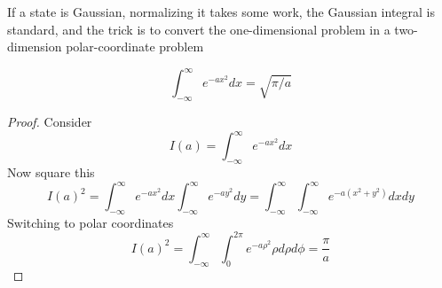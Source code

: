 \documentclass{tufte-book}
\newcommand{\infint}{\int^{\infty}_{-\infty}}
\begin{document}
If a state is Gaussian, normalizing it takes some work, the Gaussian integral is standard, and the trick is to convert the one-dimensional problem in a two-dimension polar-coordinate problem

\begin{equation}
	\label{eq:gauss}
	\infint e^{-ax^2}dx = \sqrt{\pi/a}
\end{equation}

\begin{proof}
	Consider
	\[
		I(a) = \infint e^{-ax^2}dx
	\]
	Now square this
	\[
		I(a)^2 = \infint e^{-ax^2}dx \infint e^{-ay^2}dy = \infint\infint e^{-a(x^2+y^2)}dxdy
	\]
	Switching to polar coordinates
	\[
		I(a)^2 = \infint \int^{2\pi}_{0}e^{-a\rho^2}\rho d\rho d\phi = \frac{\pi}{a}
	\]
\end{proof}

	



\backmatter





\printindex
\end{document}
